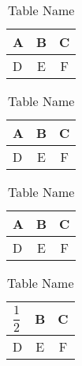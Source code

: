 \documentclass[12pt, a4paper]{report}
\begin{document}
\begin{table}
\centering
\caption{Table Name}
\begin{tabular}{|>{\raggedright}p{}|c|c|}
\hline
A & B & C \\
\hline
D & E & F \\
\hline
\end{tabular}
\end{table}
\begin{table}
\centering
\caption{Table Name}
\begin{tabular}{|>{\raggedleft}p{}|c|c|}
\hline
A & B & C \\
\hline
D & E & F \\
\hline
\end{tabular}
\end{table}
\begin{table}
\centering
\caption{Table Name}
\begin{tabular}{|>{\centering}p{}|c|c|}
\hline
A & B & C \\
\hline
D & E & F \\
\hline
\end{tabular}
\end{table}
\begin{table}
\def\arraystretch{3}
\centering
\caption{Table Name}
\begin{tabular}{|>{\raggedleft}p{}|c|c|}
\hline
$\dfrac{1}{2}$ & B & C \\
\hline
D & E & F \\
\hline
\end{tabular}
\end{table}
\end{document}
